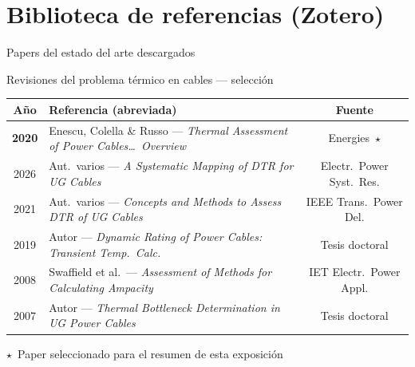 \documentclass[aspectratio=169]{beamer}
\begin{document}
\section{Biblioteca de referencias (Zotero)}

\begin{frame}{Papers del estado del arte descargados}
  \begin{block}{Revisiones del problema térmico en cables --- selección}
    \footnotesize
    \begin{tabular}{c p{7.2cm} c}
      \toprule
      \textbf{Año} & \textbf{Referencia (abreviada)} & \textbf{Fuente}\\
      \midrule
      \textbf{2020}
        & Enescu, Colella \& Russo ---
          \textit{Thermal Assessment of Power Cables\ldots\ Overview}
        & Energies~\textcolor{rojoAccent}{$\star$}\\
      [3pt]
      2026
        & Aut.\ varios ---
          \textit{A Systematic Mapping of DTR for UG Cables}
        & Electr.\ Power Syst.\ Res.\\
      [3pt]
      2021
        & Aut.\ varios ---
          \textit{Concepts and Methods to Assess DTR of UG Cables}
        & IEEE Trans.\ Power Del.\\
      [3pt]
      2019
        & Autor ---
          \textit{Dynamic Rating of Power Cables: Transient Temp.\ Calc.}
        & Tesis doctoral\\
      [3pt]
      2008
        & Swaffield et al.\ ---
          \textit{Assessment of Methods for Calculating Ampacity}
        & IET Electr.\ Power Appl.\\
      [3pt]
      2007
        & Autor ---
          \textit{Thermal Bottleneck Determination in UG Power Cables}
        & Tesis doctoral\\
      \bottomrule
    \end{tabular}
  \end{block}
  \vspace{0.2em}
  \small\textcolor{rojoAccent}{$\star$}~Paper seleccionado para el resumen de esta exposición
\end{frame}
\end{document}
